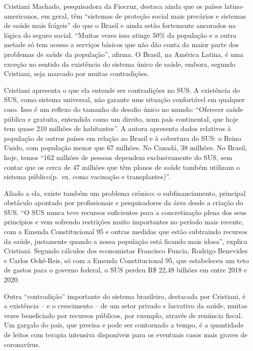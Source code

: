 \documentclass[
]{book}
\begin{document}
Cristiani Machado, pesquisadora da Fiocruz, destaca ainda que os países
latino-americanos, em geral, têm ``sistemas de proteção social mais
precários e sistemas de saúde mais frágeis'' do que o Brasil e ainda
estão fortemente ancorados na lógica do seguro social. ``Muitas vezes
isso atinge 50\% da população e a outra metade só tem acesso a serviços
básicos que não dão conta da maior parte dos problemas de saúde da
população'', afirma. O Brasil, na América Latina, é uma exceção no
sentido da existência do sistema único de saúde, embora, segundo
Cristiani, seja marcado por muitas contradições.

Cristiani apresenta o que ela entende ser contradições no SUS. A
existência do SUS, como sistema universal, não garante ums situação
confortável em qualquer caso. Isso é um reflexo do tamanho do desafio
único no mundo: ``Oferecer saúde pública e gratuita, entendida como um
direito, num país continental, que hoje tem quase 210 milhões de
habitantes''. A autora apresenta dados relativos à população de outros
países em relação ao Brasil e à cobertura do SUS: o Reino Unido, com
população menor que 67 milhões. No Canadá, 38 milhões. No Brasil, hoje,
temos ``162 milhões de pessoas dependem exclusivamente do SUS, sem
contar que os cerca de 47 milhões que têm planos de saúde também
utilizam o sistema público(p.~ex. como vacinação e transplantes)''.

Aliado a ela, existe também um problema crônico: o subfinanciamento,
principal obstáculo apontado por profissionais e pesquisadores da área
desde a criação do SUS. ``O SUS nunca teve recursos suficientes para a
concretização plena dos seus princípios e vem sofrendo restrições muito
importantes no período mais recente, com a Emenda Constitucional 95 e
outras medidas que estão subtraindo recursos da saúde, justamente quando
a nossa população está ficando mais idosa'', explica Cristiani. Segundo
cálculos dos economistas Francisco Funcia, Rodrigo Benevides e Carlos
Ocké-Reis, só com a Emenda Constitucional 95, que estabeleceu um teto de
gastos para o governo federal, o SUS perdeu R\$ 22,48 bilhões em entre
2018 e 2020.

Outra ``contradição'' importante do sistema brasileiro, destacada por
Cristiani, é a existência -- e o crescimento -- de um setor privado e
lucrativo da saúde, muitas vezes beneficiado por recursos públicos, por
exemplo, através de renúncia fiscal. Um gargalo do país, que precisa e
pode ser contornado a tempo, é a quantidade de leitos com terapia
intensiva disponíveis para os eventuais casos mais graves de
coronavírus.
\end{document}
